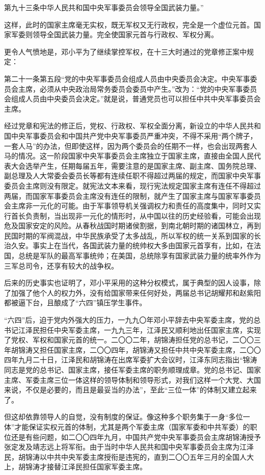 \begin{maonote}
第九十三条中华人民共和国中央军事委员会领导全国武装力量。”

这样，此时的国家主席毫无实权，既无军权又无行政权，完全是一个虚位元首。国家军委则领导全国武装力量。完全使国家元首与行政权、军权分离。

更令人气愤地是，邓小平为了继续掌控军权，在十三大时通过的党章修正案中规定：

第二十一条第五段“党的中央军事委员会组成人员由中央委员会决定。中央军事委员会主席，必须从中央政治局常务委员会委员中产生。”改为：“党的中央军事委员会组成人员由中央委员会决定。”就是说，普通党员也可以担任中共中央军事委员会主席。

经过党章和宪法的修正后，党权、行政权、军权全面分离，新设立的中华人民共和国中央军事委员会和中国共产党中央军事委员严重冲突，不得不采用“两个牌子，一套人马”的办法，但即使这样，因为两个委员会的任期不一样，也会出现两套人马的情况。这一阶段国家中央军事委员会主席独立于国家主席，直接由全国人民代表大会选举产生，任期每届五年，需要注意的是国家主席、副主席、国务院总理、副总理及人大常委会委员长等都有连续任职不得超过两届的规定，而国家中央军事委员会主席则没有限定。就宪法文本来看，现行宪法规定国家主席有连任不得超过两届，而国家军事委员会主席没有连任的限制，就产生了国家主席与国家军事委员会主席非一元化的可能。由于军事领导机关强调权力和责任的高度集中，同时又实行首长负责制，当出现非一元化的情形时，从中国以往的历史经验看，可能会出现危及国家安定的风险。从春秋战国时期诸侯割据，到南北朝时期的诸国林立，再到民国时期的军阀混战，中华民族承受了太多战乱，所以军权的统一关系到国家的长治久安。事实上在当代，各国武装力量的统帅权大多由国家元首享有，比如，在法国，总统是军队的最高军事统帅；在美国，总统除享有国家武装力量的统率外作为三军总司令，还享有较大的战争权。

后来的历史事实也证明了，邓小平采用的这种分权模式，属于典型的因人设事，除了加强了他个人的权力外，没有给国家带来任何好处，两届总书记胡耀邦和赵紫阳都被逼下台，且酿成了“六四”镇压学生事件。

“六四”后，迫于党内外强大的压力，一九九〇年邓小平辞去中央军委主席，党的总书记江泽民担任中央军委主席，一九九三年，江泽民又顺利地出任国家主席，实现了党权、军权和国家元首的统一。二〇〇二年，胡锦涛担任党的总书记，二〇〇三年胡锦涛又担任国家主席，二〇〇四年，胡锦涛又担任中共中央军委主席，二〇〇四年九月二十日，江泽民和胡锦涛在出席军委扩大会议时，江泽东同志指出“锦涛同志是党的总书记、国家主席，接任军委主席的职务顺理成章。党的总书记、国家主席、军委主席三位一体这样的领导体制和领导形式，对我们这样一个大党、大国来说，不仅是必要的，而且是最妥当的办法”，至此“三位一体”的体制又建立起来了。

但这却依靠领导人的自觉，没有制度的保证。像这种多个职务集于一身“多位一体”才能保证实权元首的体制，尤其是两个军委主席（国家军委和中共军委）的职位还是有些问题，如二〇〇四年九月，中国共产党中央军事委员会主席胡锦涛授予张定发及靖志远上将军衔。由于当时中华人民共和国中央军事委员会主席为江泽民，胡锦涛以中共中央军委主席授衔是违宪的，直到二〇〇五年三月的全国人大上，胡锦涛才接替江泽民担任国家军委主席。


\end{maonote}
